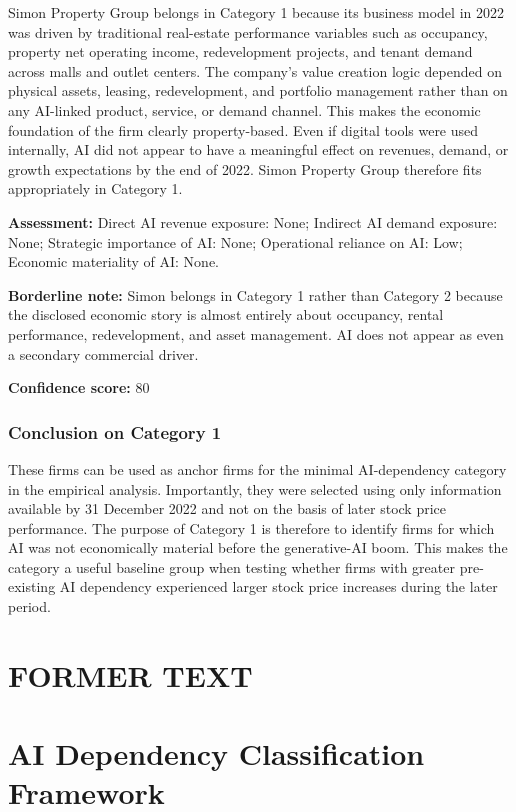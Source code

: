 \documentclass{article}
\begin{document}
Simon Property Group belongs in Category 1 because its business model in 2022 was driven by traditional real-estate performance variables such as occupancy, property net operating income, redevelopment projects, and tenant demand across malls and outlet centers. The company’s value creation logic depended on physical assets, leasing, redevelopment, and portfolio management rather than on any AI-linked product, service, or demand channel. This makes the economic foundation of the firm clearly property-based. Even if digital tools were used internally, AI did not appear to have a meaningful effect on revenues, demand, or growth expectations by the end of 2022. Simon Property Group therefore fits appropriately in Category 1.

\textbf{Assessment:} Direct AI revenue exposure: None; Indirect AI demand exposure: None; Strategic importance of AI: None; Operational reliance on AI: Low; Economic materiality of AI: None.

\textbf{Borderline note:} Simon belongs in Category 1 rather than Category 2 because the disclosed economic story is almost entirely about occupancy, rental performance, redevelopment, and asset management. AI does not appear as even a secondary commercial driver.

\textbf{Confidence score:} 80

\subsubsection*{Conclusion on Category 1}

These firms can be used as anchor firms for the minimal AI-dependency category in the empirical analysis. Importantly, they were selected using only information available by 31 December 2022 and not on the basis of later stock price performance. The purpose of Category 1 is therefore to identify firms for which AI was not economically material before the generative-AI boom. This makes the category a useful baseline group when testing whether firms with greater pre-existing AI dependency experienced larger stock price increases during the later period.


\section{FORMER TEXT}

\section*{AI Dependency Classification Framework}
\end{document}
